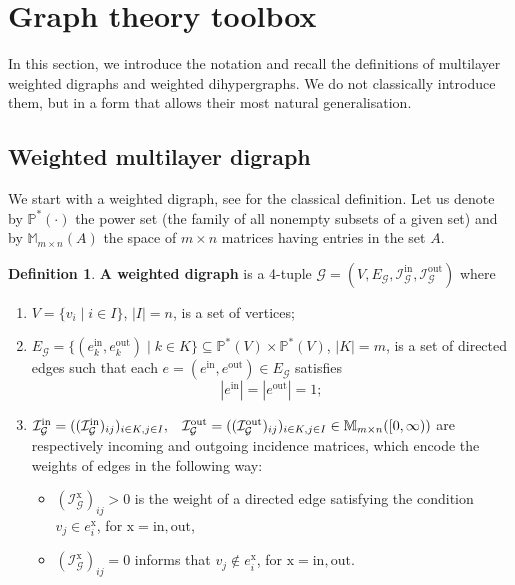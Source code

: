 \documentclass[a4paper,12pt]{article}
\theoremstyle{definition}
\newtheorem{definition}{Definition}
\theoremstyle{remark}
\newcommand{\mG}{\mathcal{G}}
\newcommand{\EG}{E_{\mathcal{G}}}
\newcommand{\tin}{\mathrm{in}}
\newcommand{\out}{\mathrm{out}}
\newcommand{\inci}{\mathcal{I}^{\tin}}
\newcommand{\inco}{\mathcal{I}^{\out}}
\begin{document}
\section{Graph theory toolbox}\label{sec:graph_theo}

In this section, we introduce the notation and recall the definitions of  multilayer weighted digraphs and weighted dihypergraphs. We do not classically introduce them, but
in a form that allows their most natural generalisation.

\subsection{Weighted multilayer digraph}\label{sec:m_graph}

We start with a weighted digraph, see \protect\cite[Sec.~2.1]{KivArena2014} for the classical definition. Let us denote by $\mathbb{P}^*(\cdot)$ the power set (the family of all nonempty subsets of a given set)  and by $\mathbb{M}_{m\times n}(A)$ the space of $m\times n$ matrices having entries in the set $A$.

\begin{definition}
    \label{def:WeightedDigraph}
     \textbf{A weighted digraph} is a 4-tuple $\mG= (V,\EG, \inci_\mG,\inco_\mG)$ where
    \begin{enumerate}
        \item $V = \{v_i\; | \; i \in I\}$, $|I|=n$, is a set of vertices;
        \item $\EG = \{(e_k^{\tin},e_k^{\out})\; | \; k \in K\}\subseteq \mathbb{P}^*(V) \times \mathbb{P}^*(V)$, $|K|=m$, is a set of directed edges such that each $e=(e^{\tin},e^{\out})\in \EG$ satisfies
            \begin{equation}\label{eq:edge}
                |e^{\tin}|=|e^{\out}|=1;
            \end{equation}
        \item $\inci_{\mG}=((\inci_{\mG})_{ij})_{i\in K,j\in I}, \hspace{0.3cm} \inco_{\mG}=((\inco_{\mG})_{ij})_{i\in K,j\in I}\in \mathbb{M}_{m\times n}([0,\infty))$ are respectively incoming and outgoing incidence matrices, which encode the weights of edges in the following way:
        \begin{itemize}
            \item $(\mathcal{I}^{\mathrm{x}}_{\mG})_{ij}>0$ is the weight of a directed edge satisfying the condition $v_{j} \in e_{i}^{\mathrm{x}}$, for $\mathrm{x}=\mathrm{in},\mathrm{out}$, 
            \item $(\mathcal{I}^{\mathrm{x}}_{\mG})_{ij}=0$ informs that $v_{j} \notin e_{i}^{\mathrm{x}}$, for $\mathrm{x}=\mathrm{in},\mathrm{out}$.
        \end{itemize}
    \end{enumerate} 
\end{definition}
\end{document}
